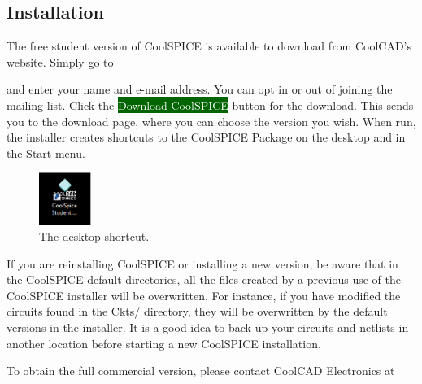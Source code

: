 \subsection{Installation}

The free student version of CoolSPICE is available to download from CoolCAD's website. Simply go to 

\begin{center}
\end{center}and enter your name and e-mail address.  You can opt in or out of joining the mailing list.  Click the {\colorbox{darkgreen}{\textcolor{white}{Download CoolSPICE}}} button for the download.  This sends you to the download page, where you can choose the version you wish.  When run, the installer creates shortcuts to the CoolSPICE Package on the desktop and in the Start menu.


\begin{figure}
  \begin{center}
    \includegraphics[width=0.15\textwidth]
	{./figures/getting_started_figures/CoolSPICEstudent_logo_shortcut.eps}
  \end{center}
  \caption{The desktop shortcut.}
  \label{fig_desktop_shortcut}
\end{figure}

 If you are reinstalling CoolSPICE or installing a new version, be aware that in the CoolSPICE default directories, all the files created by a previous use of the CoolSPICE installer will be overwritten.  For instance, if you have modified the circuits found in the \textsf{Ckts/}  directory, they will be overwritten by the default versions in the installer. It is a good idea to back up your circuits and netlists in another location before starting a new CoolSPICE installation.

To obtain the full commercial version, please contact CoolCAD Electronics at 
\begin{center}
\end{center}


